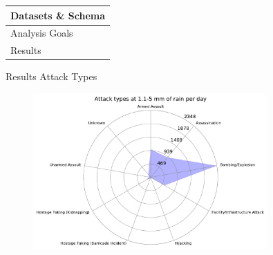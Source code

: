 \documentclass{beamer}
\begin{document}
\begin{frame}
	\begin{tabularx}{\textwidth}{X}
		\hline
		Datasets \& Schema\\
		\hline
		Analysis Goals\\
		\hline
		\rowcolor{hcolor}
		Results\\
		\hline
	\end{tabularx}
\end{frame}

\begin{frame}{Results}
	Attack Types
	
	\begin{figure}
		\includegraphics[width=0.8\textwidth]{Rain-Attack/rain11-5_starDiagram}
	\end{figure}
	
\end{frame}
\end{document}
